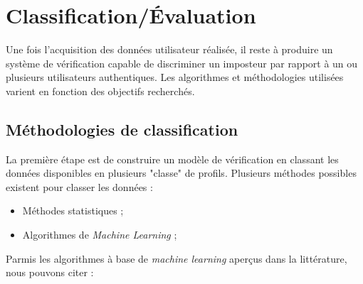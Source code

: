 \section{Classification/Évaluation}

Une fois l'acquisition des données utilisateur réalisée, il reste à produire un système de vérification capable de discriminer un imposteur par rapport à un ou plusieurs utilisateurs authentiques. Les algorithmes et méthodologies utilisées varient en fonction des objectifs recherchés.

\subsection{Méthodologies de classification}

La première étape est de construire un modèle de vérification en classant les données disponibles en plusieurs "classe" de profils. Plusieurs méthodes possibles existent pour classer les données :\\

\begin{itemize}
	\item Méthodes statistiques ;
	\item Algorithmes de \textit{Machine Learning} ;
\end{itemize}

Parmis les algorithmes à base de \textit{machine learning} aperçus dans la littérature, nous pouvons citer :\\

